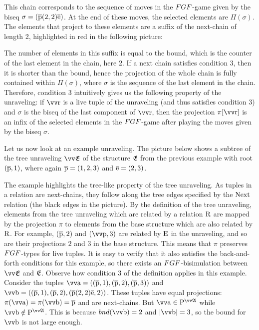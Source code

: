 This chain corresponds to the sequence of moves in the $\FGF$-game given by the biseq $\sigma = (\overline{\mathrm{p}}(2,2)\overline{\mathrm{e}})$.
At the end of these moves, the selected elements are $\Pi(\sigma)$.
The elements that project to these elements are a suffix of the next-chain of length 2, highlighted in red in the following picture:
\begin{figure}[H]
  \centering
  
\end{figure}
The number of elements in this suffix is equal to the bound, which is the counter of the last element in the chain, here $2$.
If a next chain satisfies condition 3, then it is shorter than the bound, hence the projection of the whole chain is fully contained within $\Pi(\sigma)$, where $\sigma$ is the sequence of the last element in the chain.
Therefore, condition 3 intuitively gives us the following property of the unraveling: if $\elemtuptupler$ is a live tuple of the unraveling (and thus satisfies condition 3) and $\sigma$ is the biseq of the last component of $\elemtuptupler$, then the projection $\pi[\elemtuptupler]$ is an infix of the selected elements in the $\FGF$-game after playing the moves given by the biseq $\sigma$.

Let us now look at an example unraveling.
The picture below shows a subtree of the tree unraveling $\unravel{E}$ of the structure ${\mathfrak{E}}$ from the previous example with root $(\overline{\mathrm{p}}, 1)$, where again $\overline{\mathrm{p}} = (1,2,3)$ and $\overline{\mathrm{e}} = (2,3)$.
\begin{figure}[H]
  \centering
  
\end{figure}

\noindent
The example highlights the tree-like property of the tree unraveling.
As tuples in a relation are next-chains, they follow along the tree edges specified by the $\mathrm{Next}$ relation (the black edges in the picture).
By the definition of the tree unraveling, elements from the tree unraveling which are related by a relation $\mathrm{R}$ are mapped by the projection $\pi$ to elements from the base structure which are also related by $\mathrm{R}$.
For example, $(\overline{\mathrm{p}}, 2)$ and $(\elemtuptuplep, 3)$ are related by $\mathrm{E}$ in the unraveling, and so are their projections $2$ and $3$ in the base structure.
This means that $\pi$ preserves $\FGF$-types for live tuples.
It is easy to verify that it also satisfies the back-and-forth conditions for this example, so there exists an $\FGF$-bisimulation between $\unravel{E}$ and ${\mathfrak{E}}$.
Observe how condition 3 of the definition applies in this example.
Consider the tuples $\elemtuptuplea = ((\elemtuplep, 1), (\elemtuplep, 2), (\elemtuplep, 3))$ and $\elemtuptupleb = ((\elemtuplep, 1), (\elemtuplep, 2), (\elemtuplep(2,2)\elemtuplee, 2))$.
These tuples have equal projections: $\pi(\elemtuptuplea) = \pi(\elemtuptupleb) = \elemtuplep$ and are next-chains.
But $\elemtuptuplea \in \relP^{\unravel{A}}$ while $\elemtuptupleb \notin \relP^{\unravel{A}}$.
This is because $\bound{\elemtuptupleb} = 2$ and $|\elemtuptupleb| = 3$, so the bound for $\elemtuptupleb$ is not large enough.

